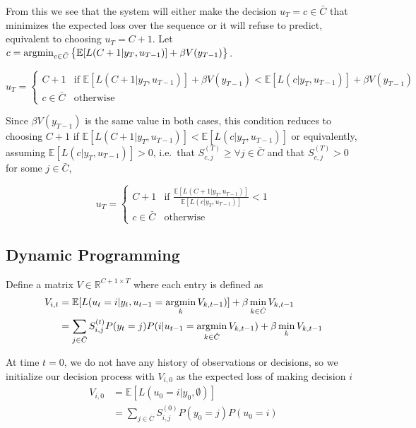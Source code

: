 \documentclass[12pt,solutions]{article}
\newcommand{\argmin}{\operatornamewithlimits{argmin}}
\newcommand{\R}{\mathbb{R}}
\newcommand{\I}{\mathbb{I}}
\newcommand{\E}{\mathbb{E}}
\begin{document}
From this we see that the system will either make the decision $u_T = c \in \bar{C}$ that minimizes the expected loss over the sequence or it will refuse to predict, equivalent to choosing $u_T = C+1$. Let $c = \argmin_{c\in \bar{C}} \big\{ \E[L(C+1|y_T, u_{T-1})] + \beta V(y_{T-1})\big\}$.

\begin{equation}
u_T = 
\begin{cases}
C+1 &  \text{if } \E[L(C+1|y_T, u_{T-1})] + \beta V(y_{T-1}) <   \E[L(c|y_T, u_{T-1})] + \beta V(y_{T-1})\\
c \in \bar{C} & \text{otherwise}
\end{cases}
\end{equation}

Since $ \beta V(y_{T-1})$ is the same value in both cases, this condition reduces to choosing $C+1$ if  $\E[L(C+1|y_T, u_{T-1})] <   \E[L(c|y_T, u_{T-1})] $ or equivalently, assuming $ \E[L(c|y_T, u_{T-1})]  > 0$, i.e.\ that $S^{(T)}_{c,j} \geq \forall j \in \bar{C}$ and that $ S^{(T)}_{c,j}  >0 $ for some $j \in \bar{C}$,

\begin{equation}
u_T = 
\begin{cases}
C+1 &  \text{if } \frac{\E[L(C+1|y_T, u_{T-1})]}{\E[L(c|y_T, u_{T-1})]} < 1\\
c \in \bar{C} & \text{otherwise}
\end{cases}
\end{equation}


\subsection{Dynamic Programming}

Define a matrix $V \in \R^{C+1\times T}$ where each entry is defined as
\begin{align}
V_{i,t} &=  \E[L(u_t=i|y_t, u_{t-1}=\argmin_{k} V_{k,t-1})] + \beta \min_{k\in\hat{C}} V_{k,t-1}\\
&= \sum_{j \in \bar{C}} S_{i,j}^{(t)} P(y_t=j)P(i|u_{t-1}=\argmin_{k\in\hat{C}} V_{k,t-1}) + \beta \min_k V_{k,t-1}
 \label{eqn:dp_step}
\end{align}

At time $t=0$, we do not have any history of observations or decisions, so we initialize our decision process with $V_{i,0}$ as the expected loss of making decision $i$
\begin{align}
V_{i,0} &=  \E[L(u_0=i|y_0, \emptyset)] \\
&=  \sum_{j \in \bar{C}} S_{i,j}^{(0)} P(y_0=j)P(u_0=i)\label{eqn:dp_init}
\end{align}
\end{document}

